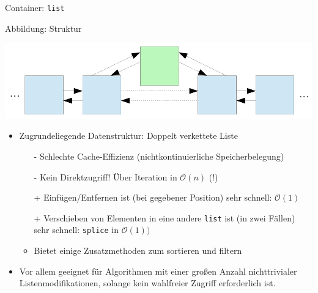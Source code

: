 \begin{frame}[fragile]{Container: \texttt{list}}
	\begin{block}{Abbildung: Struktur}
		\begin{center}
			\includegraphics[width=0.6\linewidth]{images/list.pdf}
		\end{center}
	\end{block}

	\begin{itemize}
		\item Zugrundeliegende Datenstruktur: Doppelt verkettete Liste
		\pause
		\begin{itemize}
			\item[-] Schlechte Cache-Effizienz (nichtkontinuierliche Speicherbelegung)
			\item[-] Kein Direktzugriff! Über Iteration in $\mathcal{O}(n)$ (!)
			\pause
			\item[+] Einfügen/Entfernen ist (bei gegebener Position) sehr schnell: $\mathcal{O}(1)$
			\item[+] Verschieben von Elementen in eine andere \verb|list| ist (in zwei Fällen) sehr schnell: \verb|splice| in $\mathcal{O}(1))$
			\item Bietet einige Zusatzmethoden zum sortieren und filtern
		\end{itemize}
		\pause
		\item Vor allem geeignet für Algorithmen mit einer großen Anzahl nichttrivialer Listenmodifikationen, solange kein wahlfreier Zugriff erforderlich ist.
	\end{itemize}
\end{frame}

